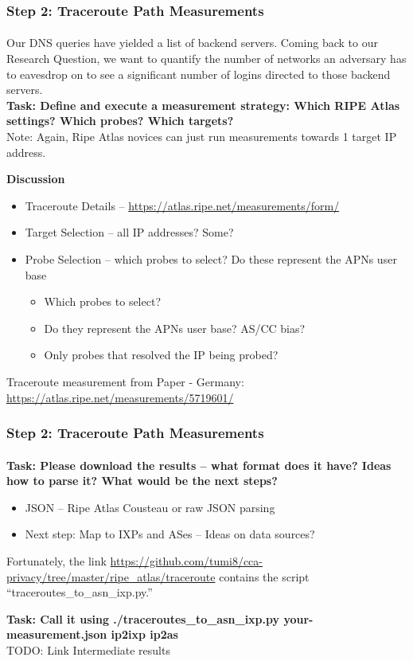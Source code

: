 \begin{frame}
\frametitle{Step 2: Traceroute Path Measurements}
\framesubtitle{}
Our DNS queries have yielded a list of backend servers. Coming back to our Research Question, we want to quantify the number of networks an adversary has to eavesdrop on to see a significant number of logins directed to those backend servers. \\
\textbf{Task: Define and execute a measurement strategy: Which RIPE Atlas settings? Which probes? Which targets?}\\
Note: Again, Ripe Atlas novices can just run measurements towards 1 target IP address.

\pause
\textbf{Discussion}
\begin{itemize}
	\item Traceroute Details -- \url{https://atlas.ripe.net/measurements/form/}
	\item Target Selection -- all IP addresses? Some? 
	\item Probe Selection -- which probes to select? Do these represent the APNs user base
	\begin{itemize}
		\item Which probes to select?
		\item Do they represent the APNs user base? AS/CC bias?
		\item Only probes that resolved the IP being probed?
	\end{itemize}
\end{itemize}

Traceroute measurement from Paper - Germany: \url{https://atlas.ripe.net/measurements/5719601/}
\end{frame}
\clearpage
\begin{frame}
\frametitle{Step 2: Traceroute Path Measurements}
\framesubtitle{}
\textbf{Task: Please download the results -- what format does it have? Ideas how to parse it? What would be the next steps?}
\pause
\begin{itemize}
	\item JSON -- Ripe Atlas Cousteau or raw JSON parsing
	\item Next step: Map to IXPs and ASes -- Ideas on data sources?
\end{itemize}
\pause
Fortunately, the link \url{https://github.com/tumi8/cca-privacy/tree/master/ripe_atlas/traceroute} contains the script ``traceroutes\_to\_asn\_ixp.py.''

\textbf{Task: Call it using ./traceroutes\_to\_asn\_ixp.py your-measurement.json ip2ixp ip2as}\\
TODO: Link Intermediate results
\end{frame}
